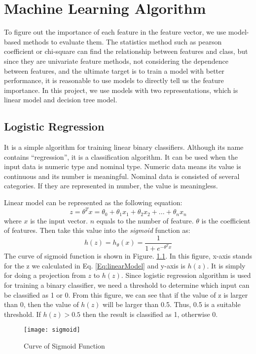 \iffalse

\fi

\chapter{Machine Learning Algorithm}
To figure out the importance of each feature in the feature vector, we use model-based methods to evaluate them. The statistics method such as pearson coefficient or chi-square can find the relationship between features and class, but since they are univariate feature methods, not considering the dependence between features, and the ultimate target is to train a model with better performance, it is reasonable to use models to directly tell us the feature importance. In this project, we use models with two representations, which is linear model and decision tree model.

\section{Logistic Regression}
It is a simple algorithm for training linear binary classifiers. Although its name contains ``regression'', it is a classification algorithm. It can be used when the input data is numeric type and nominal type. Numeric data means its value is continuous and its number is meaningful. Nominal data is consisted of several categories. If they are represented in number, the value is meaningless.

Linear model can be represented as the following equation:
\begin{equation} \label{Eq:linearModel}
z = \theta^Tx=\theta_0+\theta_1x_1+\theta_2x_2+...+\theta_nx_n
\end{equation}
where $x$ is the input vector. $n$ equals to the number of feature. $\theta$ is the coefficient of features. Then take this value into the \textit{sigmoid} function as:
\begin{equation} \label{Eq:sigmoidFunction}
h(z) = h_{\theta}(x) = \frac{1}{1+e^{-\theta^Tx}}
\end{equation}
The curve of sigmoid function is shown in Figure. \ref{fig:sigmoid}. In this figure, x-axis stands for the z we calculated in Eq. \ref{Eq:linearModel} and y-axis is $h(z)$. It is simply for doing a projection from $z$ to $h(z)$. Since logistic regression algorithm is used for training a binary classifier, we need a threshold to determine which input can be classified as 1 or 0. From this figure, we can see that if the value of z is larger than 0, then the value of $h(z)$ will be larger than 0.5. Thus, 0.5 is a suitable threshold. If $h(z)>0.5$ then the result is classified as 1, otherwise 0.
\begin{figure}[h]\centering
\texttt{[image: sigmoid]}
\caption{Curve of Sigmoid Function} \label{fig:sigmoid} \end{figure}

